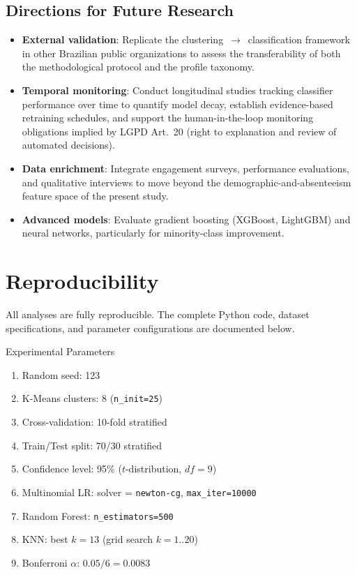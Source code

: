 \documentclass[alpha-refs,english]{RBCA_v3.0}
\begin{document}
\subsection{Directions for Future Research}
\begin{itemize}
    \item \textbf{External validation}: Replicate the clustering~$\rightarrow$~classification framework in other Brazilian public organizations to assess the transferability of both the methodological protocol and the profile taxonomy.
    \item \textbf{Temporal monitoring}: Conduct longitudinal studies tracking classifier performance over time to quantify model decay, establish evidence-based retraining schedules, and support the human-in-the-loop monitoring obligations implied by LGPD Art.~20 (right to explanation and review of automated decisions).
    \item \textbf{Data enrichment}: Integrate engagement surveys, performance evaluations, and qualitative interviews to move beyond the demographic-and-absenteeism feature space of the present study.
    \item \textbf{Advanced models}: Evaluate gradient boosting (XGBoost, LightGBM) and neural networks, particularly for minority-class improvement.
\end{itemize}


\section*{Reproducibility}

All analyses are fully reproducible. The complete Python code, dataset specifications, and parameter configurations are documented below.

Experimental Parameters
\begin{enumerate}
    \item Random seed: 123
    \item K-Means clusters: 8 (\texttt{n\_init=25})
    \item Cross-validation: 10-fold stratified
    \item Train/Test split: 70/30 stratified
    \item Confidence level: 95\% ($t$-distribution, $df=9$)
    \item Multinomial LR: solver = \texttt{newton-cg}, \texttt{max\_iter=10000}
    \item Random Forest: \texttt{n\_estimators=500}
    \item KNN: best $k=13$ (grid search $k=1..20$)
    \item Bonferroni $\alpha$: $0.05/6 = 0.0083$
\end{enumerate}
\end{document}
